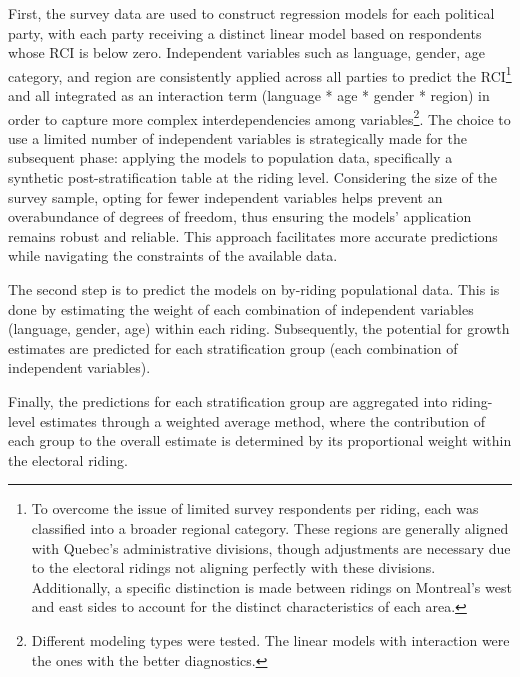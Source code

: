\documentclass[
  journal=medium,
  manuscript=article-type,
  year=2024
]{cup-journal}
\begin{document}
First, the survey data are used to construct regression models for each political party, with each party receiving a distinct linear model based on respondents whose RCI is below zero. Independent variables such as language, gender, age category, and region are consistently applied across all parties to predict the RCI\footnote{To overcome the issue of limited survey respondents per riding, each was classified into a broader regional category. These regions are generally aligned with Quebec's administrative divisions, though adjustments are necessary due to the electoral ridings not aligning perfectly with these divisions. Additionally, a specific distinction is made between ridings on Montreal's west and east sides to account for the distinct characteristics of each area.} and all integrated as an interaction term (language * age * gender * region) in order to capture more complex interdependencies among variables\footnote{Different modeling types were tested. The linear models with interaction were the ones with the better diagnostics.}. The choice to use a limited number of independent variables is strategically made for the subsequent phase: applying the models to population data, specifically a synthetic post-stratification table at the riding level. Considering the size of the survey sample, opting for fewer independent variables helps prevent an overabundance of degrees of freedom, thus ensuring the models' application remains robust and reliable. This approach facilitates more accurate predictions while navigating the constraints of the available data. 


The second step is to predict the models on by-riding populational data. This is done by estimating the weight of each combination of independent variables (language, gender, age) within each riding. Subsequently, the potential for growth estimates are predicted for each stratification group (each combination of independent variables).


Finally, the predictions for each stratification group are aggregated into riding-level estimates through a weighted average method, where the contribution of each group to the overall estimate is determined by its proportional weight within the electoral riding.
\end{document}
